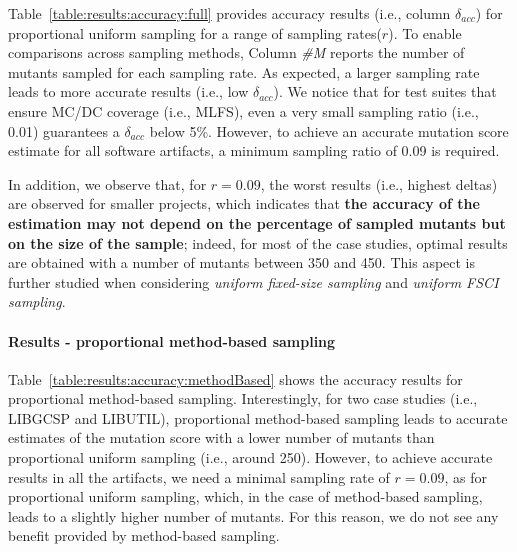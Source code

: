 Table~\ref{table:results:accuracy:full} provides accuracy results (i.e., column $\delta_{acc}$) for proportional uniform sampling for a range of sampling rates($r$). 
To enable comparisons across sampling methods, Column \emph{\#M} reports the number of mutants sampled for each sampling rate.
As expected, a larger sampling rate leads to more accurate results (i.e., low $\delta_{acc}$). 
We notice that for test suites that ensure MC/DC coverage (i.e., MLFS), even a very small sampling ratio (i.e., 0.01) guarantees a $\delta_{acc}$ below 5\%. However, {to achieve an accurate mutation score estimate for all software artifacts, a minimum sampling ratio of 0.09} is required.



In addition, we observe that, for $r=0.09$, the worst results (i.e., highest deltas) are observed for smaller projects, which indicates that \textbf{the accuracy of the estimation may not depend on the percentage of sampled mutants but on the size of the sample}; indeed, for most of the case studies, optimal results are obtained with a number of mutants between 350 and 450. This aspect is further studied when considering  \emph{uniform fixed-size sampling} and \emph{uniform FSCI sampling}.

\paragraph{Results - proportional method-based sampling}

Table~\ref{table:results:accuracy:methodBased} shows the accuracy results for proportional method-based sampling. 
Interestingly, for two case studies (i.e., LIBGCSP and LIBUTIL), proportional method-based sampling leads to accurate estimates of the mutation score with a lower number of mutants than proportional uniform sampling (i.e., around 250).
{However, to achieve accurate results in all the artifacts, we need a minimal sampling rate of $r=0.09$, as for proportional uniform sampling, which, in the case of method-based sampling, leads to a slightly higher number of mutants. For this reason, we do not see any benefit provided by method-based sampling.}



